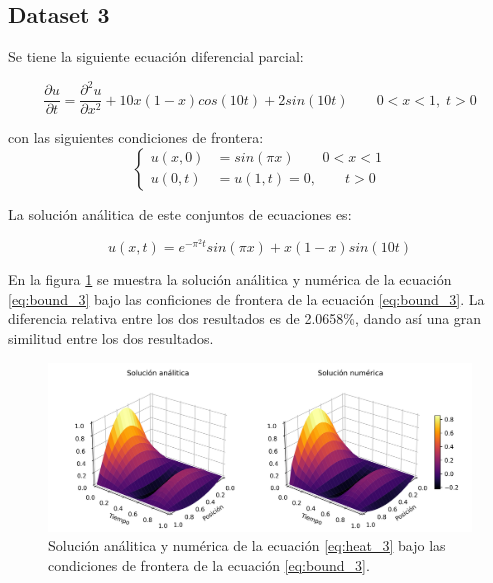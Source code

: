 \subsection{Dataset 3}

Se tiene la siguiente ecuación diferencial parcial:

\begin{equation}
    \frac{\partial u}{\partial t} = \frac{\partial^2 u}{\partial x^2}+10x(1-x)cos(10t)+2sin(10t)\qquad 0<x<1, \; t>0 \label{eq:heat_3}
\end{equation}

con las siguientes condiciones de frontera:
\begin{equation}
    \begin{cases}
        u(x,0) & = sin(\pi x) \qquad 0<x<1 \\
        u(0,t) & =u(1,t) = 0, \qquad t>0
    \end{cases} \label{eq:bound_3}
\end{equation}

La solución análitica de este conjuntos de ecuaciones es:

\begin{equation}
    u(x,t)= e^{-\pi^2 t}sin(\pi x)+x(1-x)sin(10t) \label{eq:sol_3}
\end{equation}

En la figura \ref{fig:sol_3} se muestra la solución análitica y numérica de la ecuación \ref{eq:bound_3} bajo las conficiones de frontera de la ecuación \ref{eq:bound_3}. La diferencia relativa entre los dos resultados es de 2.0658\%, dando así una gran similitud entre los dos resultados.

\begin{figure}[H]
    \centering
    \includegraphics[width=17cm]{Graphics/surface_3.png}
    \caption{Solución análitica y numérica de la ecuación \ref{eq:heat_3} bajo las condiciones de frontera de la ecuación \ref{eq:bound_3}.}
    \label{fig:sol_3}
\end{figure}

